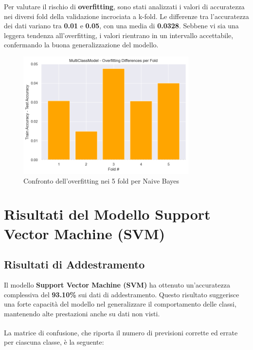 Per valutare il rischio di \textbf{overfitting}, sono stati analizzati i valori di accuratezza nei diversi fold della validazione incrociata a k-fold. Le differenze tra l'accuratezza dei dati variano tra \textbf{0.01} e \textbf{0.05}, con una media di \textbf{0.0328}. Sebbene vi sia una leggera tendenza all'overfitting, i valori rientrano in un intervallo accettabile, confermando la buona generalizzazione del modello.

\begin{figure}[H]
    \centering
    \includegraphics[width=0.8\textwidth]{images/overfitting_naive_bayes.png}
    \caption{Confronto dell'overfitting nei 5 fold per Naive Bayes}
    \label{fig:overfitting_naive_bayes}
\end{figure}

\newpage

\section{Risultati del Modello Support Vector Machine (SVM)}

\subsection{Risultati di Addestramento}

Il modello \textbf{Support Vector Machine (SVM)} ha ottenuto un'accuratezza complessiva del \textbf{93.10\%} sui dati di addestramento. Questo risultato suggerisce una forte capacità del modello nel generalizzare il comportamento delle classi, mantenendo alte prestazioni anche su dati non visti. \\ \\
La matrice di confusione, che riporta il numero di previsioni corrette ed errate per ciascuna classe, è la seguente:

